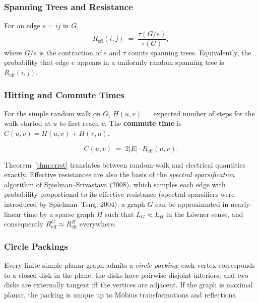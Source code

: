 \subsubsection{Spanning Trees and Resistance}

\begin{theorem}
\label{thm:effspan}
For an edge $e = ij$ in $G$,
\[
  R_{\mathrm{eff}}(i, j) \;=\; \frac{\tau(G/e)}{\tau(G)},
\]
where $G/e$ is the contraction of $e$ and $\tau$ counts spanning
trees. Equivalently, the probability that edge $e$ appears in a
uniformly random spanning tree is $R_{\mathrm{eff}}(i, j)$.
\end{theorem}

\subsubsection{Hitting and Commute Times}

\begin{definition}
For the simple random walk on $G$, $H(u, v) = $ expected number of
steps for the walk started at $u$ to first reach $v$. The
\textbf{commute time} is $C(u, v) = H(u, v) + H(v, u)$.
\end{definition}

\begin{theorem}\label{thm:crrst}
\[
  C(u, v) \;=\; 2 |E| \cdot R_{\mathrm{eff}}(u, v).
\]
\end{theorem}

\begin{remark}
Theorem~\ref{thm:crrst} translates between random-walk and electrical
quantities exactly. Effective resistances are also the basis of the
\emph{spectral sparsification} algorithm of Spielman--Srivastava
(2008), which samples each edge with probability proportional to its
effective resistance (spectral sparsifiers were introduced by
Spielman--Teng, 2004): a graph $G$ can be approximated
in nearly-linear time by a sparse graph $H$ such that
$L_G \approx L_H$ in the L\"owner sense, and consequently
$R_{\mathrm{eff}}^G \approx R_{\mathrm{eff}}^H$ everywhere.
\end{remark}

\subsubsection{Circle Packings}

\begin{theorem}
Every finite simple planar graph admits a \emph{circle packing}: each
vertex corresponds to a closed disk in the plane, the disks have
pairwise disjoint interiors, and two disks are externally tangent iff
the vertices are adjacent. If the graph is maximal planar, the packing
is unique up to M\"obius transformations and reflections.
\end{theorem}

